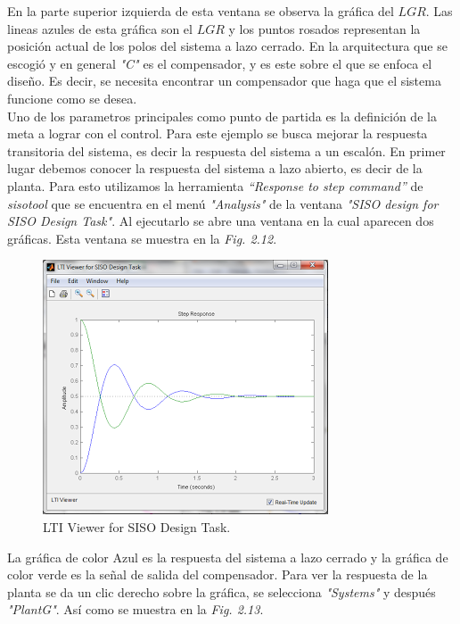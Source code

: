 \documentclass[a4paper,12pt,twoside]{proyectotanquesecci}
\begin{document}
En la parte superior izquierda de esta ventana se observa la gráfica del $LGR$. Las lineas azules de esta gráfica son el $LGR$ y los puntos rosados representan   la posición actual de los polos del sistema a lazo cerrado. En la arquitectura que se escogió y en general \textit{"C"} es el compensador, y es este sobre el que se enfoca el diseño. Es decir, se necesita encontrar un compensador que haga que el sistema funcione como se desea. \\

Uno de los parametros principales como punto de partida es la definición de la meta a lograr con el control. Para este ejemplo se busca mejorar la respuesta transitoria del sistema, es decir la respuesta del sistema a un escalón. En primer lugar debemos conocer la respuesta del sistema a lazo abierto, es decir de la planta. Para esto utilizamos la herramienta \textit{“Response to step command”} de \textit{sisotool} que se encuentra en el menú \textit{"Analysis"} de la ventana  \textit{"SISO design for SISO Design Task"}. Al ejecutarlo se abre una ventana en la cual aparecen dos gráficas. Esta ventana se muestra en la \textit{Fig. 2.12}. \\

\begin{figure}[h]
\centering
\includegraphics[scale=0.7]{Ventana6}
\renewcommand{\figurename}{Fig.}
\caption{LTI Viewer for SISO Design Task.}
\label{LTI Viewer for SISO Design Task.}
\end{figure}

La gráfica de color Azul es la respuesta del sistema a lazo cerrado y la gráfica de color verde es la señal de salida del compensador. Para ver la respuesta de la planta se da un clic derecho sobre la gráfica, se selecciona \textit{"Systems"} y después \textit{"PlantG"}. Así como se muestra en la \textit{Fig. 2.13}. \\
\end{document}
